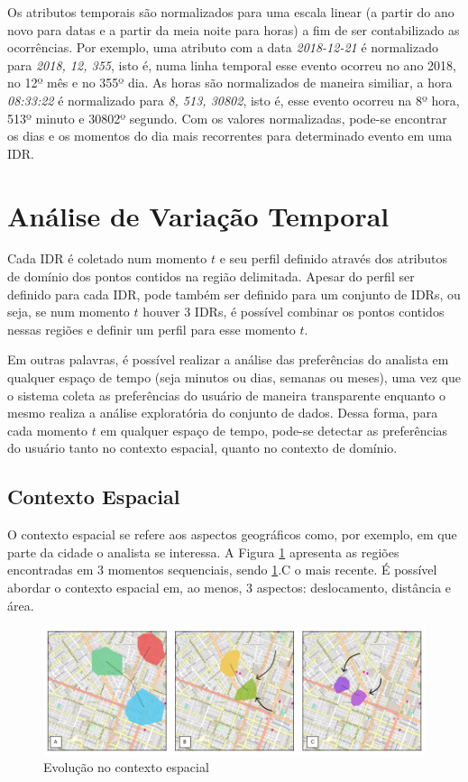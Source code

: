 Os atributos temporais são normalizados para uma escala linear (a partir do ano novo para datas e a partir da meia noite para horas) a fim de ser contabilizado as ocorrências. Por exemplo, uma atributo com a data {\em 2018-12-21} é normalizado para {\em 2018, 12, 355}, isto é, numa linha temporal esse evento ocorreu no ano 2018, no 12º mês e no 355º dia. As horas são normalizados de maneira similiar, a hora {\em 08:33:22} é normalizado para {\em 8, 513, 30802}, isto é, esse evento ocorreu na 8º hora, 513º minuto e 30802º segundo. Com os valores normalizadas, pode-se encontrar os dias e os momentos do dia mais recorrentes para determinado evento em uma IDR.


\section{Análise de Variação Temporal}

Cada IDR é coletado num momento $t$ e seu perfil definido através dos atributos de domínio dos pontos contidos na região delimitada. Apesar do perfil ser definido para cada IDR, pode também ser definido para um conjunto de IDRs, ou seja, se num momento $t$ houver 3 IDRs, é possível combinar os pontos contidos nessas regiões e definir um perfil para esse momento $t$. 

Em outras palavras, é possível realizar a análise das preferências do analista em qualquer espaço de tempo (seja minutos ou dias, semanas ou meses), uma vez que o sistema coleta as preferências do usuário de maneira transparente enquanto o mesmo realiza a análise exploratória do conjunto de dados. Dessa forma, para cada momento $t$ em qualquer espaço de tempo, pode-se detectar as preferências do usuário tanto no contexto espacial, quanto no contexto de domínio.

\subsection{Contexto Espacial}

O contexto espacial se refere aos aspectos geográficos como, por exemplo, em que parte da cidade o analista se interessa. A Figura \ref{fig:analise-contexto-espacial} apresenta as regiões encontradas em 3 momentos sequenciais, sendo \ref{fig:analise-contexto-espacial}.C o mais recente. É possível abordar o contexto espacial em, ao menos, 3 aspectos: deslocamento, distância e área.

\begin{figure}[]
	\centering
	\includegraphics[width=\textwidth]{imagens/analise-contexto-espacial}
	\caption{Evolução no contexto espacial}
	\label{fig:analise-contexto-espacial}
\end{figure}

